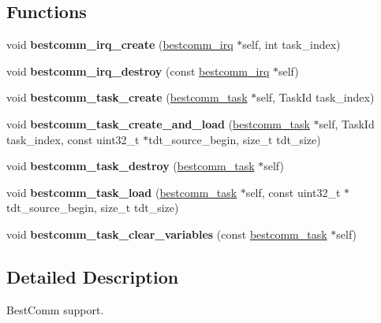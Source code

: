 \subsection*{Functions}
\begin{DoxyCompactItemize}
\item 
\mbox{\label{group__BestComm_ga84928089ae82feb8c283665ce5bb0c68}} 
void {\bfseries bestcomm\+\_\+irq\+\_\+create} (\mbox{\hyperlink{structbestcomm__irq}{bestcomm\+\_\+irq}} $\ast$self, int task\+\_\+index)
\item 
\mbox{\label{group__BestComm_ga86e62103e6142c7a405f66f5cda2c111}} 
void {\bfseries bestcomm\+\_\+irq\+\_\+destroy} (const \mbox{\hyperlink{structbestcomm__irq}{bestcomm\+\_\+irq}} $\ast$self)
\item 
\mbox{\label{group__BestComm_ga28a8e98ba47735e4979f92fe6d4ab637}} 
void {\bfseries bestcomm\+\_\+task\+\_\+create} (\mbox{\hyperlink{structbestcomm__task}{bestcomm\+\_\+task}} $\ast$self, Task\+Id task\+\_\+index)
\item 
\mbox{\label{group__BestComm_gac4f171eba04c027e2638d8d17af82d74}} 
void {\bfseries bestcomm\+\_\+task\+\_\+create\+\_\+and\+\_\+load} (\mbox{\hyperlink{structbestcomm__task}{bestcomm\+\_\+task}} $\ast$self, Task\+Id task\+\_\+index, const uint32\+\_\+t $\ast$tdt\+\_\+source\+\_\+begin, size\+\_\+t tdt\+\_\+size)
\item 
\mbox{\label{group__BestComm_gad206e90082a168d7d9a6c68a5cfae39e}} 
void {\bfseries bestcomm\+\_\+task\+\_\+destroy} (\mbox{\hyperlink{structbestcomm__task}{bestcomm\+\_\+task}} $\ast$self)
\item 
\mbox{\label{group__BestComm_gae34d6c963583b6f40ce7e4ecfeb7b9d8}} 
void {\bfseries bestcomm\+\_\+task\+\_\+load} (\mbox{\hyperlink{structbestcomm__task}{bestcomm\+\_\+task}} $\ast$self, const uint32\+\_\+t $\ast$tdt\+\_\+source\+\_\+begin, size\+\_\+t tdt\+\_\+size)
\item 
\mbox{\label{group__BestComm_ga1d9c5cec14ddbce16bfb118d3a8e9c21}} 
void {\bfseries bestcomm\+\_\+task\+\_\+clear\+\_\+variables} (const \mbox{\hyperlink{structbestcomm__task}{bestcomm\+\_\+task}} $\ast$self)
\end{DoxyCompactItemize}


\subsection{Detailed Description}
Best\+Comm support. 

